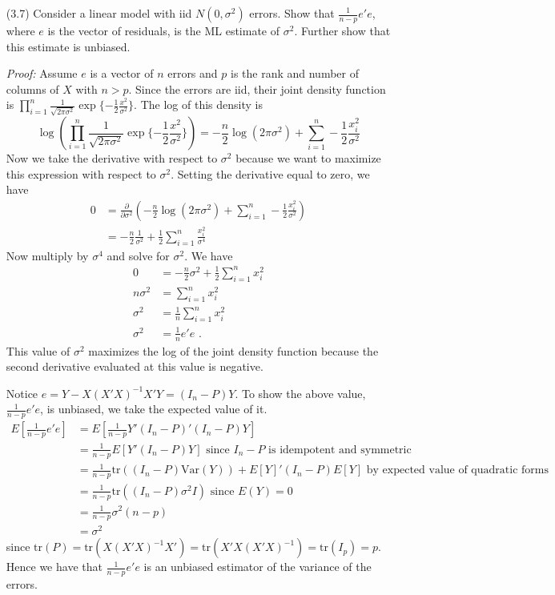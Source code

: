\documentclass[letterpaper,10pt]{article}
\begin{document}
\begin{enumerate}
\item[(3.7)]
Consider a linear model with iid $N(0, \sigma^2)$ errors. Show that $\frac{1}{n-p} e' e$, where $e$ is the vector of residuals, is the ML estimate of $\sigma^2$. Further show that this estimate is unbiased.

\textit{Proof:}
Assume $e$ is a vector of $n$ errors and $p$ is the rank and number of columns of $X$ with $n > p$.
Since the errors are iid, their joint density function is 
$\prod_{i=1}^n \frac{1}{\sqrt{2\pi \sigma^2}} \exp \{-\frac{1}{2} \frac{x^2}{\sigma^2} \}$. 
The log of this density is 
\[
\log(\prod_{i=1}^n \frac{1}{\sqrt{2\pi \sigma^2}} \exp \{-\frac{1}{2} \frac{x^2}{\sigma^2} \}) = -\frac{n}{2} \log (2 \pi \sigma^2) + \sum_{i=1}^n - \frac{1}{2} \frac{x_i^2}{\sigma^2}
\]
Now we take the derivative with respect to $\sigma^2$ because we want to maximize this expression with respect to $\sigma^2$. 
Setting the derivative equal to zero, we have
\begin{align*}
0 &= \frac{\partial}{\partial \sigma^2} \left(-\frac{n}{2} \log (2 \pi \sigma^2) + \sum_{i=1}^n - \frac{1}{2} \frac{x_i^2}{\sigma^2} \right) \\
&= -\frac{n}{2} \frac{1}{\sigma^2} + \frac{1}{2} \sum_{i=1}^n \frac{x_i^2}{\sigma^4}
\end{align*}
Now multiply by $\sigma^4$ and solve for $\sigma^2$. We have
\begin{align*}
0 &= -\frac{n}{2} \sigma ^ 2 + \frac{1}{2} \sum_{i=1}^n x_i^2 \\
n \sigma^2 &= \sum_{i=1}^n x_i^2 \\
\sigma^2 &= \frac{1}{n} \sum_{i=1}^n x_i^2 \\
\sigma^2 &= \frac{1}{n} e' e \text{ .}
\end{align*}
 This value of $\sigma^2$ maximizes the log of the joint density function because the second derivative evaluated at this value is negative. 
 
Notice $e = Y - X(X'X)^{-1}X'Y = (I_n - P)Y$. To show the above value, $\frac{1}{n-p} e' e$, is unbiased, we take the expected value of it.
\begin{align*}
E[ \frac{1}{n-p} e' e] &= E[\frac{1}{n-p} Y'(I_n - P)'(I_n -P)Y] \\
&=\frac{1}{n-p} E[Y' (I_n - P)Y] \text{ since $I_n - P$ is idempotent and symmetric} \\
&= \frac{1}{n-p} \text{tr}((I_n - P)\text{Var}(Y)) + E[Y]'(I_n - P)E[Y]\text{ by expected value of quadratic forms}\\
&= \frac{1}{n-p} \text{tr}((I_n - P)\sigma^2 I) \text{ since $E(Y) = 0$ } \\
&= \frac{1}{n-p} \sigma^2 (n - p) \\
&= \sigma^2
\end{align*}
since $\text{tr}(P) = \text{tr}(X(X'X)^{-1}X') =\text{tr}(X'X(X'X)^{-1}) =\text{tr}(I_p) = p$. Hence we have that $ \frac{1}{n-p} e' e$ is an unbiased estimator of the variance of the errors.


\end{enumerate}
\end{document}
